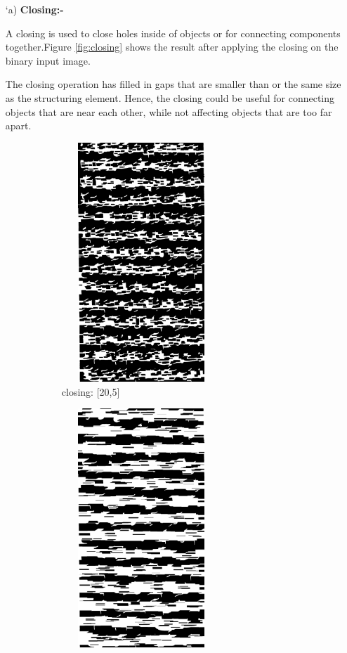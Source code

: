 \begin{itemize}
        \item[\char `a)] \textbf{Closing:-}
         
         A closing is used to close holes inside of objects or for connecting components together.Figure \ref{fig:closing} shows the result after applying the closing on the binary input  image.
         
         The closing operation has filled in gaps that are smaller than or the same size as the structuring element. Hence, the closing could be useful for connecting objects that are near each other, while not affecting objects that are too far apart.

        \begin{figure}[!htb]
             \centering
             \begin{subfigure}[b]{0.4\textwidth}
                 \centering
                 \includegraphics[width=6cm, height=9cm]{images/clos1.png}
                 \caption{closing: [20,5]}
                 \label{fig:close1}
             \end{subfigure}
             \hfill
             \begin{subfigure}[b]{0.4\textwidth}
                 \centering
                 \includegraphics[width=6cm, height=9cm]{images/clos2.png}

\end{subfigure}
\end{figure}
\end{itemize}
